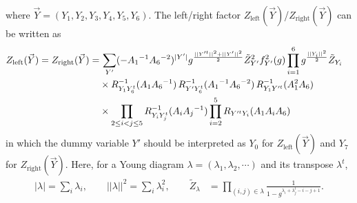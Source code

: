 \documentclass[letterpaper, 11pt]{article}
\newcommand{\nn}{\nonumber}
\begin{document}
{\begin{align}
\end{align}
where $\vec{Y}=(Y_1, Y_2, Y_3, Y_4, Y_5, Y_6)$. The left/right factor 
$Z_{\text{left}}(\vec{Y})$/$Z_{\text{right}}(\vec{Y})$ can be written as 
\begin{align}
\begin{split}
Z_{\text{left}}(\vec{Y}) = Z_{\text{right}}(\vec{Y})=& \,
\sum_{Y'} ( - A_1{}^{-1} A_6{}^{-2})^{|Y'|} 
g^{\frac{||Y'^t||^2+||Y'||^2}{2}} \tilde{Z}_{Y'}^2 f_{Y'}^2(g)
\prod_{i=1}^6 g^{\frac{||Y_i||^2}{2}} \tilde{Z}_{Y_i} 
\cr 
& 
\times 
R_{Y_1 Y_6^t}^{-1} (A_1 A_6{}^{-1})\,R_{Y' Y_6^t}^{-1} (A_1{}^{-1} A_6{}^{-2})\,R_{Y_1Y'^t }^{-1} (A_1^2A_6) \cr 
& 
\times  
 \prod_{2 \le i <  j \le 5} R_{Y_i Y_j^t}^{-1} (A_i A_j{}^{-1})
 \prod_{i=2}^5 R_{Y'^t Y_i} (A_1 A_i  A_6) 
\end{split}
\end{align}
in which the dummy variable $Y'$ should be interpreted as $Y_0$ for $Z_{\text{left}}(\vec{Y})$ and  $Y_7$ for $Z_{\text{right}}(\vec{Y})$. %
Here, for a Young diagram $\lambda = (\lambda_1, \lambda_2, \cdots)$ and its transpose $\lambda^t$,  
\begin{align}
  |\lambda|=\sum_{i}\lambda_i, \qquad ||\lambda||^2 =\sum_{i}\lambda_i^2, \qquad  \tilde{Z}_{\lambda} 
&= \prod_{(i,j) \in \lambda} \frac{1}{1 - g^{\lambda_i + \lambda^t_j - i - j +1} }. 	

\end{align}}
\end{document}
